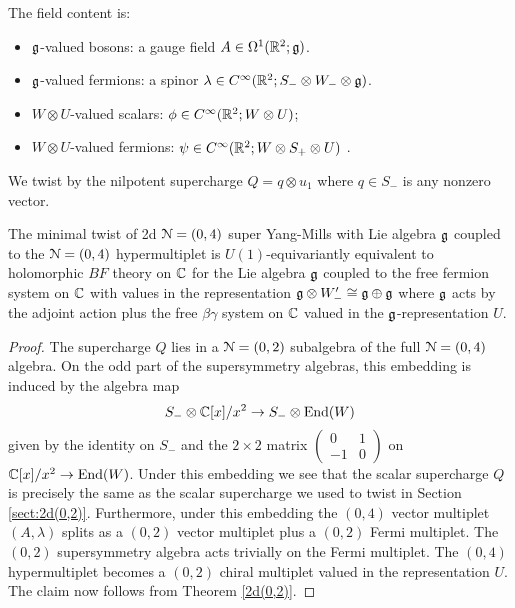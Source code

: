 \documentclass[10pt, oneside]{article}
\begin{document}
The field content is:
\begin{itemize}
\item $\mathfrak g$-valued bosons: a gauge field $A \in \Omega^1(\mathbb R^2;\mathfrak g)$.
\item $\mathfrak g$-valued fermions: a spinor $\lambda \in C^\infty(\mathbb R^2 ; S_- \otimes W_- \otimes \mathfrak g)$. 
\item $W \otimes U$-valued scalars: $\phi \in C^\infty(\mathbb R^2 ; W \otimes U)$;
\item $W \otimes U$-valued fermions: $\psi \in C^\infty(\mathbb R^2 ; W \otimes S_+ \otimes U)$ .
\end{itemize}

We twist by the nilpotent supercharge $Q = q \otimes u_1$ where $q \in S_-$ is any nonzero vector. 

\begin{theorem}\label{2d(0,4)}
The minimal twist of 2d $\mathcal N=(0,4)$ super Yang-Mills with Lie algebra $\mathfrak g$ coupled to the $\mathcal N=(0,4)$ hypermultiplet is $U(1)$-equivariantly equivalent to holomorphic $BF$ theory on $\mathbb C$ for the Lie algebra $\mathfrak g$ coupled to the free fermion system on $\mathbb C$ with values in the representation $\mathfrak g \otimes W_-' \cong \mathfrak g \oplus \mathfrak g$ where $\mathfrak g$ acts by the adjoint action plus the free $\beta\gamma$ system on $\mathbb C$ valued in the $\mathfrak g$-representation $U$. 
\end{theorem}

\begin{proof}
The supercharge $Q$ lies in a $\mathcal N = (0,2)$ subalgebra of the full $\mathcal N = (0,4)$ algebra.
On the odd part of the supersymmetry algebras, this embedding is induced by the algebra map
\[
S_- \otimes \mathbb C[x] / x^2 \to S_- \otimes {\rm End}(W)
\]
given by the identity on $S_-$ and the $2 \times 2$ matrix $\begin{pmatrix} 0 &1 \\ -1 & 0 \end{pmatrix}$ on $\mathbb C[x]/x^2 \to {\rm End}(W)$. 
Under this embedding we see that the scalar supercharge $Q$ is precisely the same as the scalar supercharge we used to twist in Section \ref{sect:2d(0,2)}. 
Furthermore, under this embedding the $(0,4)$ vector multiplet $(A, \lambda)$ splits as a $(0,2)$ vector multiplet plus a $(0,2)$ Fermi multiplet. 
The $(0,2)$ supersymmetry algebra acts trivially on the Fermi multiplet. 
The $(0,4)$ hypermultiplet becomes a $(0,2)$ chiral multiplet valued in the representation $U$. 
The claim now follows from Theorem \ref{2d(0,2)}. 
\end{proof}
\end{document}
